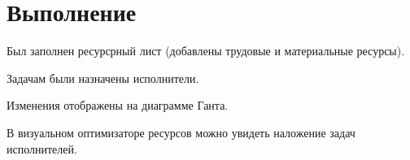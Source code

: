 \newpage

\section*{Выполнение}

Был заполнен ресурсрный лист (добавлены трудовые и материальные ресурсы).


Задачам были назначены исполнители.


Изменения отображены на диаграмме Ганта.


В визуальном оптимизаторе ресурсов можно увидеть наложение задач исполнителей.

\clearpage

